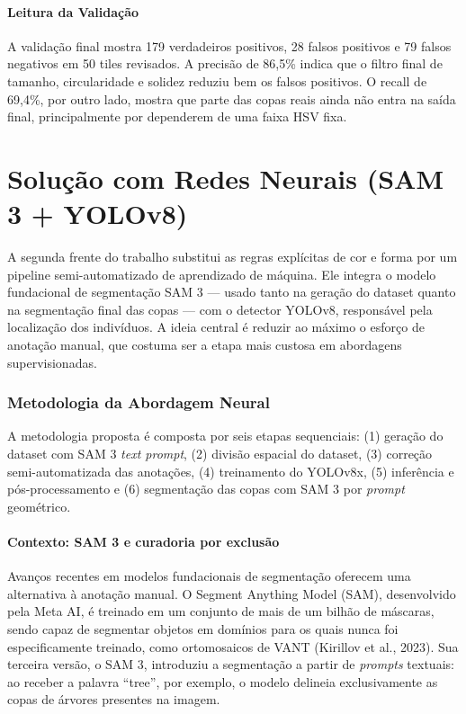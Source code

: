\documentclass[12pt, a4paper]{article}
\begin{document}
\subsection{Leitura da Validação}

A validação final mostra 179 verdadeiros positivos, 28 falsos positivos e 79
falsos negativos em 50 tiles revisados. A precisão de 86,5\% indica que o filtro final de tamanho,
circularidade e solidez reduziu bem os falsos positivos. O
recall de 69,4\%, por outro lado, mostra que parte das copas reais ainda não entra
na saída final, principalmente por dependerem de uma faixa HSV fixa.

\part{Solução com Redes Neurais (SAM 3 + YOLOv8)}

A segunda frente do trabalho substitui as regras explícitas de cor e forma por um
pipeline semi-automatizado de aprendizado de máquina. Ele integra o modelo
fundacional de segmentação SAM 3 — usado tanto na geração do dataset quanto na
segmentação final das copas — com o detector YOLOv8, responsável pela localização
dos indivíduos. A ideia central é reduzir ao máximo o esforço de anotação manual,
que costuma ser a etapa mais custosa em abordagens supervisionadas.

\section{Metodologia da Abordagem Neural}

A metodologia proposta é composta por seis etapas sequenciais:
(1) geração do dataset com SAM 3 \textit{text prompt}, (2) divisão espacial do
dataset, (3) correção semi-automatizada das anotações, (4) treinamento do YOLOv8x,
(5) inferência e pós-processamento e (6) segmentação das copas com SAM 3 por
\textit{prompt} geométrico.

\subsection{Contexto: SAM 3 e curadoria por exclusão}

Avanços recentes em modelos fundacionais de segmentação oferecem uma alternativa à
anotação manual. O Segment Anything Model (SAM), desenvolvido pela Meta AI, é
treinado em um conjunto de mais de um bilhão de máscaras, sendo capaz de segmentar
objetos em domínios para os quais nunca foi especificamente treinado, como
ortomosaicos de VANT (Kirillov et al., 2023). Sua terceira versão, o SAM 3,
introduziu a segmentação a partir de \textit{prompts} textuais: ao receber a
palavra ``tree'', por exemplo, o modelo delineia exclusivamente as copas de
árvores presentes na imagem.
\end{document}
